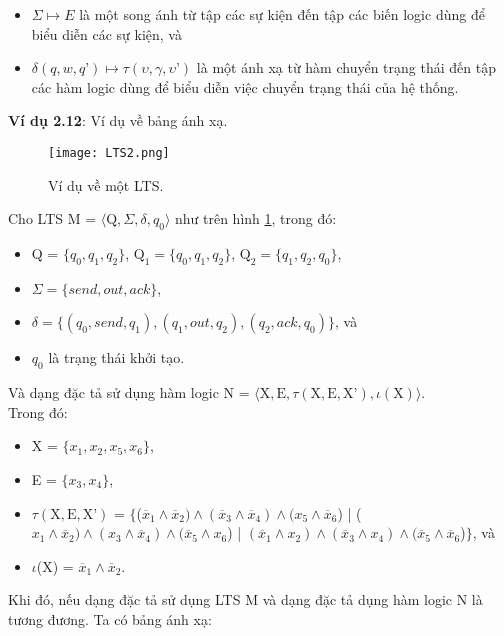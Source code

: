 \documentclass[a4paper,13pt,oneside,openany]{book}
\begin{document}
\begin{flushleft}
\begin{itemize}
			\item $\Sigma \mapsto E$ là một song ánh từ tập các sự kiện đến tập các biến logic dùng để biểu diễn các sự kiện, và
			\item $\delta(q, w, q\textrm{'}) \mapsto \tau(\upsilon, \gamma, \upsilon\textrm{'})$ là một ánh xạ từ hàm chuyển trạng thái đến tập các hàm logic dùng để biểu diễn việc chuyển trạng thái của hệ thống.
		\end{itemize}
		\textbf{Ví dụ 2.12}: Ví dụ về bảng ánh xạ.\\
		\begin{figure}[h]
			\centering
			\texttt{[image: LTS2.png]}
			\caption{Ví dụ về một LTS.}
			\label{fig:LTS3}
		\end{figure}
		Cho LTS M = $\langle\textrm{Q}, \Sigma, \delta, q_{0}\rangle$ như trên hình \ref{fig:LTS3}, trong đó:
		\begin{itemize}
			\item Q = $\{q_0, q_1, q_2\}$, $\textrm{Q}_1 = \{q_0, q_1, q_2\}$, $\textrm{Q}_2 = \{q_1, q_2, q_0\}$,
			\item $\Sigma = \{send, out, ack\}$,
			\item $\delta = \{(q_0, send, q_1), (q_1, out, q_2), (q_2, ack, q_0)\}$, và
			\item $q_0$ là trạng thái khởi tạo.
		\end{itemize}
		Và dạng đặc tả sử dụng hàm logic N = $\langle\textrm{X}, \textrm{E}, \tau(\textrm{X}, \textrm{E}, \textrm{X'}), \iota(\textrm{X})\rangle$.\\
		Trong đó:
		\begin{itemize}
			\item X = $\{x_1, x_2, x_5, x_6\}$,
			\item E = $\{x_3, x_4\}$,
			\item $\tau(\textrm{X}, \textrm{E}, \textrm{X'})$ = $\{$($\overline{x}_1 \land \overline{x}_2) \land (\overline{x}_3 \land \overline{x}_4) \land (x_5 \land \overline{x}_6$) | ($x_1\land\overline{x}_2)\land (x_3\land \overline{x}_4)\land (\overline{x}_5 \land x_6$) | $(\overline{x}_1\land x_2)\land(\overline{x}_3\land x_4)\land (\overline{x}_5\land\overline{x}_6$)$\}$, và
			\item $\iota$(X) = $\overline{x}_1 \land \overline{x}_2$.
		\end{itemize}
		Khi đó, nếu dạng đặc tả sử dụng LTS M và dạng đặc tả dụng hàm logic N là tương đương. Ta có bảng ánh xạ:
		\begin{table}[!ht]
			\centering
			\renewcommand{\arraystretch}{1.25}

\end{table}
\end{flushleft}
\end{document}
